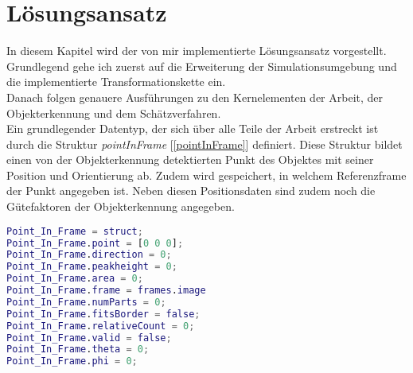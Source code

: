 \section{Lösungsansatz}
In diesem Kapitel wird der von mir implementierte Lösungsansatz vorgestellt. Grundlegend gehe ich zuerst auf die Erweiterung der Simulationsumgebung und die implementierte Transformationskette ein.\\
Danach folgen genauere Ausführungen zu den Kernelementen der Arbeit, der Objekterkennung und dem Schätzverfahren.\\

Ein grundlegender Datentyp, der sich über alle Teile der Arbeit erstreckt ist durch die Struktur \textit{pointInFrame} [\ref{pointInFrame}] definiert. Diese Struktur bildet einen von der Objekterkennung detektierten Punkt des Objektes mit seiner Position und Orientierung ab. Zudem wird gespeichert, in welchem Referenzframe der Punkt angegeben ist. Neben diesen Positionsdaten sind zudem noch die Gütefaktoren der Objekterkennung angegeben. 

\begin{lstlisting}[language=Matlab,caption=\textit{pointInFrame} Struktur Initialisierung, label = pointInFrame]
Point_In_Frame = struct;
Point_In_Frame.point = [0 0 0];
Point_In_Frame.direction = 0;
Point_In_Frame.peakheight = 0;
Point_In_Frame.area = 0;
Point_In_Frame.frame = frames.image
Point_In_Frame.numParts = 0;
Point_In_Frame.fitsBorder = false;
Point_In_Frame.relativeCount = 0;
Point_In_Frame.valid = false;
Point_In_Frame.theta = 0;
Point_In_Frame.phi = 0;
\end{lstlisting}